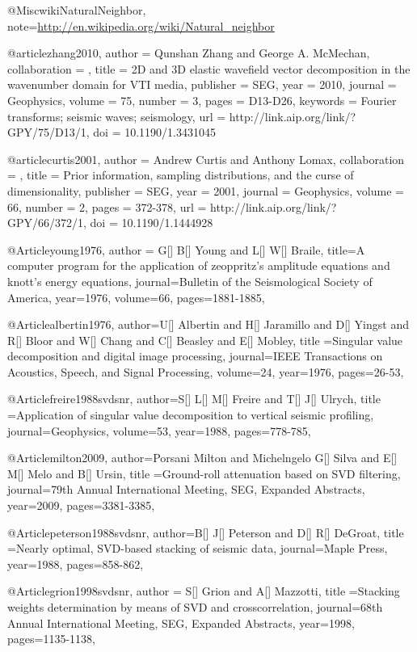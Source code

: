 @Misc{wikiNaturalNeighbor,
  note={\url{http://en.wikipedia.org/wiki/Natural_neighbor}  }
}


@article{zhang2010,
author = {Qunshan Zhang and George A. McMechan},
collaboration = {},
title = {2{D} and 3{D} elastic wavefield vector decomposition in the wavenumber domain for VTI media},
publisher = {SEG},
year = {2010},
journal = {Geophysics},
volume = {75},
number = {3},
pages = {D13-D26},
keywords = {Fourier transforms; seismic waves; seismology},
url = {http://link.aip.org/link/?GPY/75/D13/1},
doi = {10.1190/1.3431045}
}

@article{curtis2001,
author = {Andrew Curtis and Anthony Lomax},
collaboration = {},
title = {Prior information, sampling distributions, and the curse of dimensionality},
publisher = {SEG},
year = {2001},
journal = {Geophysics},
volume = {66},
number = {2},
pages = {372-378},
url = {http://link.aip.org/link/?GPY/66/372/1},
doi = {10.1190/1.1444928}
}

@Article{young1976,
  author = {G[] B[] Young and L[] W[] Braile},
  title={A computer program for the application of zeoppritz's amplitude equations and knott's energy equations},
  journal={Bulletin of the Seismological Society of America},
  year=1976,
  volume=66,
  pages={1881-1885},
}

@Article{albertin1976,
  author={U[] Albertin and H[] Jaramillo and D[] Yingst and R[] Bloor and W[] Chang and C[] Beasley and E[] Mobley},
  title ={Singular value decomposition and digital image processing},
  journal={IEEE Transactions on Acoustics, Speech, and Signal Processing},
  volume=24,
  year=1976,
  pages={26-53},
}

@Article{freire1988svdsnr,
  author={S[] L[] M[] Freire and T[] J[] Ulrych},
  title ={Application of singular value decomposition to vertical seismic profiling},
  journal={Geophysics},
  volume=53,
  year=1988,
  pages={778-785},
}

@Article{milton2009,
  author={Porsani Milton and Michelngelo G[] Silva and E[] M[] Melo and B[] Ursin},
  title ={Ground-roll attenuation based on SVD filtering},
  journal={79th Annual International Meeting, SEG, Expanded Abstracts},
  year=2009,
  pages={3381-3385},
}

@Article{peterson1988svdsnr,
  author={B[] J[] Peterson and D[] R[] DeGroat},
  title ={Nearly optimal, SVD-based stacking of seismic data},
  journal={Maple Press},
  year=1988,
  pages={858-862},
}

@Article{grion1998svdsnr,
  author = {S[] Grion and A[] Mazzotti},
  title ={Stacking weights determination by means of SVD and crosscorrelation},
  journal={68th Annual International Meeting, SEG, Expanded Abstracts},
  year=1998,
  pages={1135-1138},
}

